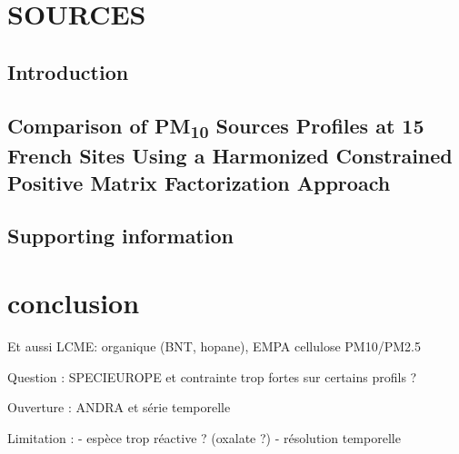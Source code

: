 \section{SOURCES}%
\label{sec:sources}

\subsection{Introduction}

\subsection{Comparison of PM\textsubscript{10} Sources Profiles at 15 French Sites Using a Harmonized Constrained Positive Matrix Factorization Approach}%
\label{sub:article}



\subsection{Supporting information}%
\label{sub:supporting_information}




\section{conclusion}%
\label{sec:conclusion}

Et aussi LCME: organique (BNT, hopane), EMPA cellulose PM10/PM2.5

Question : SPECIEUROPE et contrainte trop fortes sur certains profils ?

Ouverture : ANDRA et série temporelle

Limitation : 
- espèce trop réactive ? (oxalate ?)
- résolution temporelle



